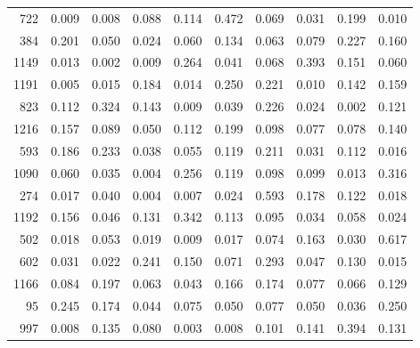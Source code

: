 \begin{longtable}{rrrrrrrrrr}
   722 & 0.009 & 0.008 & 0.088 & 0.114 & 0.472 & 0.069 & 0.031 & 0.199 & 0.010 \\
   384 & 0.201 & 0.050 & 0.024 & 0.060 & 0.134 & 0.063 & 0.079 & 0.227 & 0.160 \\
  1149 & 0.013 & 0.002 & 0.009 & 0.264 & 0.041 & 0.068 & 0.393 & 0.151 & 0.060 \\
  1191 & 0.005 & 0.015 & 0.184 & 0.014 & 0.250 & 0.221 & 0.010 & 0.142 & 0.159 \\
   823 & 0.112 & 0.324 & 0.143 & 0.009 & 0.039 & 0.226 & 0.024 & 0.002 & 0.121 \\
  1216 & 0.157 & 0.089 & 0.050 & 0.112 & 0.199 & 0.098 & 0.077 & 0.078 & 0.140 \\
   593 & 0.186 & 0.233 & 0.038 & 0.055 & 0.119 & 0.211 & 0.031 & 0.112 & 0.016 \\
  1090 & 0.060 & 0.035 & 0.004 & 0.256 & 0.119 & 0.098 & 0.099 & 0.013 & 0.316 \\
   274 & 0.017 & 0.040 & 0.004 & 0.007 & 0.024 & 0.593 & 0.178 & 0.122 & 0.018 \\
  1192 & 0.156 & 0.046 & 0.131 & 0.342 & 0.113 & 0.095 & 0.034 & 0.058 & 0.024 \\
   502 & 0.018 & 0.053 & 0.019 & 0.009 & 0.017 & 0.074 & 0.163 & 0.030 & 0.617 \\
   602 & 0.031 & 0.022 & 0.241 & 0.150 & 0.071 & 0.293 & 0.047 & 0.130 & 0.015 \\
  1166 & 0.084 & 0.197 & 0.063 & 0.043 & 0.166 & 0.174 & 0.077 & 0.066 & 0.129 \\
    95 & 0.245 & 0.174 & 0.044 & 0.075 & 0.050 & 0.077 & 0.050 & 0.036 & 0.250 \\
   997 & 0.008 & 0.135 & 0.080 & 0.003 & 0.008 & 0.101 & 0.141 & 0.394 & 0.131 \\
\end{longtable}
